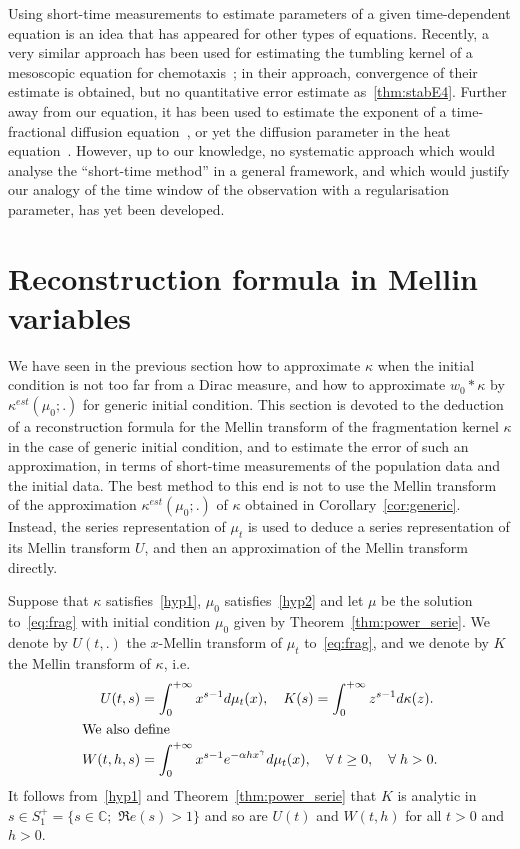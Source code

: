 \documentclass[AHL,Unicode,longabstracts,published]{cedram}
\newcommand*\dst{\displaystyle}
\newcommand*\C{\mathbb{C}}
\let\oldforall\forall
\renewcommand*{\forall}{\mathrel{\oldforall}}
\begin{document}
\begin{rema}
Using short-time measurements to estimate parameters of a given time-dependent equation is an idea that has appeared for other types of equations. Recently, a very similar approach has been used for estimating the tumbling kernel of a mesoscopic equation for chemotaxis~\cite{hellmuth2022kinetic}; in their approach, convergence of their estimate is obtained, but no quantitative error estimate as~\eqref{thm:stabE4}. Further away from our equation, it has been used to estimate the exponent of a time-fractional diffusion equation~\cite{li2019inverse}, or yet the diffusion parameter in the heat equation~\cite{cao2006natural}. However, up to our knowledge, no systematic approach which would analyse the ``short-time method'' in a general framework, and which would justify our analogy of the time window of the observation with a regularisation parameter, has yet been developed.
\end{rema}



\section{Reconstruction formula in Mellin variables}\label{sec:reco}
We have seen in the previous section how to approximate $\kappa$ when the initial condition is not too far from a Dirac measure, and how to approximate $w_0 * \kappa$ by $\kappa^{est}(\mu _0;.)$ for generic initial condition. This section is devoted to the deduction of a reconstruction formula for the Mellin transform of the fragmentation kernel $\kappa$ in the case of generic initial condition, and to estimate the error of such an approximation, in terms of short-time measurements of the population data and the initial data. The best method to this end is not to use the Mellin transform of the approximation $\kappa^{est}(\mu_0;.)$ of $\kappa$ obtained in Corollary~\ref{cor:generic}. Instead, the series representation of $\mu_t$ is used to deduce a series representation of its Mellin transform $U$, and then an approximation of the Mellin transform directly.

Suppose that $\kappa $ satisfies~\eqref{hyp1}, $\mu _0$ satisfies~\eqref{hyp2} and let $\mu $ be the solution to~\eqref{eq:frag} with initial condition $\mu_0$ given by Theorem~\ref{thm:power_serie}. We denote by $U(t,.)$ the $x$-Mellin transform of $\mu_t$ to~\eqref{eq:frag}, and we denote by $K$ the Mellin transform of $\kappa$, i.e.
\begin{align*}
U(t,s) &= \dst\int_0^{+\infty} x^{s-1} d\mu_t(x), \quad K(s)= \dst\int_0^{+\infty} z^{s-1} d\kappa(z).
\\
\intertext{We also define}
W(t,h,s) &= \dst\int_0^{+\infty} x^{s-1}e^{-\alpha h x^{\gamma}} d\mu_t(x),\quad\forall t\geq0,\quad\forall h> 0.
\end{align*}
It follows from~\eqref{hyp1} and Theorem~\ref{thm:power_serie} that $K$ is analytic in $s\in S_1^+= \{s\in \C;\,\,\Re e(s)> 1\}$ and so are $U(t)$ and $W(t, h)$ for all $t>0$ and $h>0$.
\end{document}
